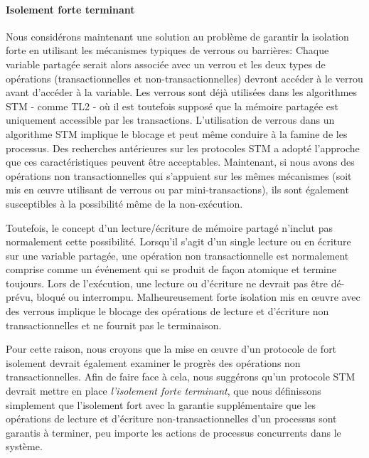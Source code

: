 \paragraph{Isolement forte terminant}

Nous considérons maintenant une solution au problème de garantir la isolation forte en utilisant les mécanismes typiques de verrous ou barrières:
Chaque variable partagée serait alors associée avec un verrou et les deux types de opérations (transactionnelles et non-transactionnelles) devront accéder à le verrou avant d'accéder à la variable.
Les verrous sont déjà utilisées dans les algorithmes STM - comme TL2 \cite{DSS06} - où il est toutefois supposé que la mémoire partagée est uniquement accessible par les transactions.
L'utilisation de verrous dans un algorithme STM implique le blocage et peut même conduire à la famine de les processus.
Des recherches antérieures sur les protocoles STM a adopté l'approche que ces caractéristiques peuvent être acceptables.
Maintenant, si nous avons des opérations non transactionnelles qui s'appuient sur les mêmes mécanismes (soit mis en œuvre utilisant de verrous ou par mini-transactions),
ils sont également susceptibles à la possibilité même de la non-exécution.


Toutefois, le concept d'un lecture/écriture de mémoire partagé n'inclut pas normalement cette possibilité.
Lorsqu'il s'agit d'un single lecture ou en écriture sur une variable partagée, une opération non transactionnelle est normalement comprise comme un événement qui se produit de façon atomique et termine toujours.
Lors de l'exécution, une lecture ou d'écriture ne devrait pas être dé-prévu, bloqué ou interrompu.
Malheureusement forte isolation mis en œuvre avec des verrous implique le blocage des opérations de lecture et d'écriture non transactionnelles et ne fournit pas le terminaison.



Pour cette raison, nous croyons que la mise en œuvre d'un protocole de fort isolement devrait également examiner le progrès des opérations non transactionnelles.
Afin de faire face à cela, nous suggérons qu'un protocole STM devrait mettre en place \emph{l'isolement forte terminant},
que nous définissons simplement que l'isolement fort avec la garantie supplémentaire que les opérations de lecture et d'écriture non-transactionnelles d'un processus sont garantis à terminer, peu importe les actions de processus concurrents dans le système.


